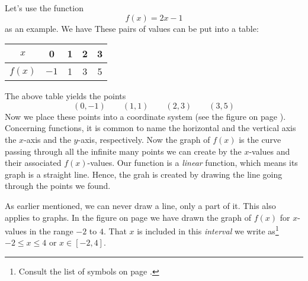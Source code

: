 Let's use the function
\[ f(x)=2x-1 \]
as an example. We have
These pairs of values can be put into a table:
	\begin{center}
	\begin{tabular}{c | c |c |c|c}
		$ x $ & 0 & 1 & 2 & 3 \\ \hline
		$ f(x) $ &$  -1 $ & 1&3 &5
	\end{tabular}
\end{center}
The above table yields the points
\[ (0, -1)\quad\quad(1, 1)\quad\quad(2, 3)\quad\quad(3, 5) \]
Now we place these points into a coordinate system (see the figure on page \pageref{funkfig}). Concerning functions, it is common to name the horizontal and the vertical axis the $ x $-axis and the $ y $-axis, respectively. 
Now the graph of $ f(x) $ is the curve passing through all the infinite many points we can create by the $ x$-values and their associated $ f(x) $-values. Our function is a \textit{linear} function, which means its graph is a straight line. Hence, the grah is created by drawing the line going through the points we found.\vsk

As earlier mentioned, we can never draw a line, only a part of it. This also applies to graphs. In the figure on page \pageref{funkfig} we have drawn the graph of $ f(x) $ for $ x $-values in the range $ -2 $ to $ 4 $. That $ x $ is included in this \textit{interval} we write as\footnote{Consult the list of symbols on page \pageref{Symbol}.} $ -2\leq x\leq 4 $ or $ x\in[-2, 4] $.
\newpage

 \label{funkfig} \vspace{-18pt}


